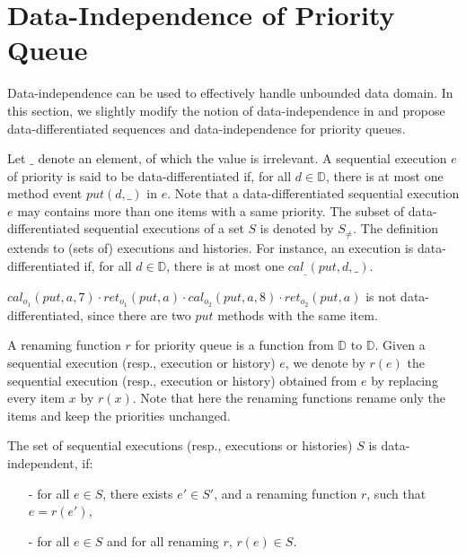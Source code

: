 \section{Data-Independence of Priority Queue}
\label{sec:data-independence of priority queue}

Data-independence \cite{Wolper:1986} can be used to effectively handle unbounded data domain. In this section, we slightly modify the notion of data-independence in \cite{Wolper:1986} and propose data-differentiated sequences and data-independence for priority queues.

Let $\_$ denote an element, of which the value is irrelevant. A sequential execution $e$ of priority is said to be data-differentiated if, for all $d \in \mathbb{D}$, there is at most one method event $\textit{put}(d,\_)$ in $e$. Note that a data-differentiated sequential execution $e$ may contains more than one items with a same priority. The subset of data-differentiated sequential executions of a set $S$ is denoted by $S_{\neq}$. The definition extends to (sets of) executions and histories. For instance, an execution is data-differentiated if, for all $d \in \mathbb{D}$, there is at most one $\textit{cal}_{\_}(\textit{put},d,\_)$.

\begin{example}\label{example:data-differentiated}
$\textit{cal}_{o_1}(\textit{put},a,7) \cdot \textit{ret}_{o_1}(\textit{put},a) \cdot \textit{cal}_{o_2}(\textit{put},a,8) \cdot \textit{ret}_{o_2}(\textit{put},a)$ is not data-differentiated, since there are two $\textit{put}$ methods with the same item.
\end{example}

A renaming function $r$ for priority queue is a function from $\mathbb{D}$ to $\mathbb{D}$. Given a sequential execution (resp., execution or history) $e$, we denote by $r(e)$ the sequential execution (resp., execution or history) obtained from $e$ by replacing every item $x$ by $r(x)$. Note that here the renaming functions rename only the items and keep the priorities unchanged.

\begin{definition}\label{def:priority-value data-independence}
The set of sequential executions (resp., executions or histories) $S$ is data-independent, if:
\begin{itemize}
\setlength{\itemsep}{0.5pt}
\item[-] for all $e \in S$, there exists $e' \in S'$, and a renaming function $r$, such that $e=r(e')$,

\item[-] for all $e \in S$ and for all renaming $r$, $r(e) \in S$.
\end{itemize}
\end{definition}

